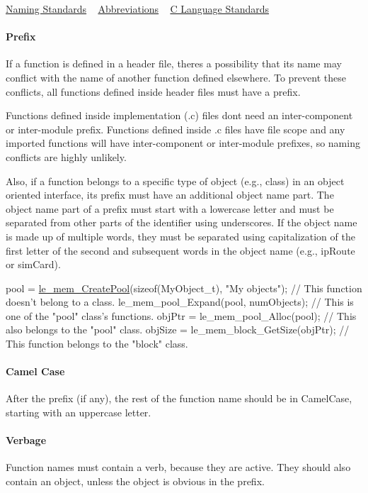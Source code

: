 \hyperlink{ccodingStdsNaming}{Naming Standards} ~\newline
 \hyperlink{ccodingStdsAbbr}{Abbreviations} ~\newline
 \hyperlink{ccodingStdsMain}{C Language Standards}\hypertarget{ccoding_stds_name_funcs_cstdsFuncsPrefix}{}\paragraph{Prefix}\label{ccoding_stds_name_funcs_cstdsFuncsPrefix}
If a function is defined in a header file, there\textquotesingle{}s a possibility that its name may conflict with the name of another function defined elsewhere. To prevent these conflicts, all functions defined inside header files must have a prefix.

Functions defined inside implementation (.c) files don\textquotesingle{}t need an inter-\/component or inter-\/module prefix. Functions defined inside .c files have file scope and any imported functions will have inter-\/component or inter-\/module prefixes, so naming conflicts are highly unlikely.

Also, if a function belongs to a specific type of object (e.\+g., class) in an object oriented interface, its prefix must have an additional object name part. The object name part of a prefix must start with a lowercase letter and must be separated from other parts of the identifier using underscores. If the object name is made up of multiple words, they must be separated using capitalization of the first letter of the second and subsequent words in the object name (e.\+g., ip\+Route or sim\+Card).


\begin{DoxyCode}
pool = \hyperlink{le__mem_8h_ab91efaa2978c9c1c7b2427d25b33241c}{le\_mem\_CreatePool}(\textcolor{keyword}{sizeof}(MyObject\_t), \textcolor{stringliteral}{"My objects"});  \textcolor{comment}{// This function doesn't
       belong to a class.}
le\_mem\_pool\_Expand(pool, numObjects);  \textcolor{comment}{// This is one of the "pool" class's functions.}
objPtr = le\_mem\_pool\_Alloc(pool); \textcolor{comment}{// This also belongs to the "pool" class.}
objSize = le\_mem\_block\_GetSize(objPtr);  \textcolor{comment}{// This function belongs to the "block" class.}
\end{DoxyCode}
\hypertarget{ccoding_stds_name_funcs_cstdsCamelCaseName}{}\paragraph{Camel Case}\label{ccoding_stds_name_funcs_cstdsCamelCaseName}
After the prefix (if any), the rest of the function name should be in Camel\+Case, starting with an uppercase letter.\hypertarget{ccoding_stds_name_funcs_cstdsVerbage}{}\paragraph{Verbage}\label{ccoding_stds_name_funcs_cstdsVerbage}
Function names must contain a verb, because they are active. They should also contain an object, unless the object is obvious in the prefix.

